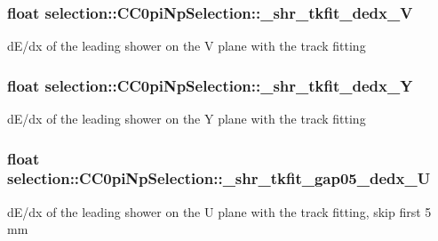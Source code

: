 \subsubsection[{\texorpdfstring{\+\_\+shr\+\_\+tkfit\+\_\+dedx\+\_\+V}{_shr_tkfit_dedx_V}}]{\setlength{\rightskip}{0pt plus 5cm}float selection\+::\+C\+C0pi\+Np\+Selection\+::\+\_\+shr\+\_\+tkfit\+\_\+dedx\+\_\+V\hspace{0.3cm}{\ttfamily [private]}}\hypertarget{classselection_1_1CC0piNpSelection_a428fc549513bea0e1ca92cf90c1148cd}{}\label{classselection_1_1CC0piNpSelection_a428fc549513bea0e1ca92cf90c1148cd}
d\+E/dx of the leading shower on the V plane with the track fitting 
\subsubsection[{\texorpdfstring{\+\_\+shr\+\_\+tkfit\+\_\+dedx\+\_\+Y}{_shr_tkfit_dedx_Y}}]{\setlength{\rightskip}{0pt plus 5cm}float selection\+::\+C\+C0pi\+Np\+Selection\+::\+\_\+shr\+\_\+tkfit\+\_\+dedx\+\_\+Y\hspace{0.3cm}{\ttfamily [private]}}\hypertarget{classselection_1_1CC0piNpSelection_ababbbc32babdef645c2edc613713ceb7}{}\label{classselection_1_1CC0piNpSelection_ababbbc32babdef645c2edc613713ceb7}
d\+E/dx of the leading shower on the Y plane with the track fitting 
\subsubsection[{\texorpdfstring{\+\_\+shr\+\_\+tkfit\+\_\+gap05\+\_\+dedx\+\_\+U}{_shr_tkfit_gap05_dedx_U}}]{\setlength{\rightskip}{0pt plus 5cm}float selection\+::\+C\+C0pi\+Np\+Selection\+::\+\_\+shr\+\_\+tkfit\+\_\+gap05\+\_\+dedx\+\_\+U\hspace{0.3cm}{\ttfamily [private]}}\hypertarget{classselection_1_1CC0piNpSelection_ad0504ef7cf7c8fa5a0059fbaedd6861b}{}\label{classselection_1_1CC0piNpSelection_ad0504ef7cf7c8fa5a0059fbaedd6861b}
d\+E/dx of the leading shower on the U plane with the track fitting, skip first 5 mm 
